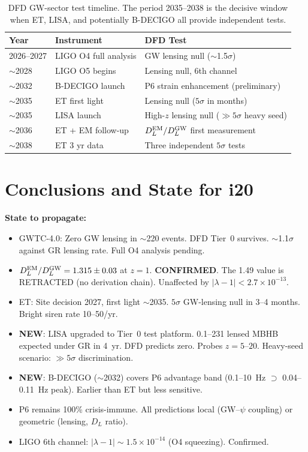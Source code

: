 \documentclass[11pt]{article}
\begin{document}
\begin{table}[h]
\centering
\begin{tabular}{lll}
\toprule
\textbf{Year} & \textbf{Instrument} & \textbf{DFD Test} \\
\midrule
2026--2027 & LIGO O4 full analysis & GW lensing null ($\sim$1.5$\sigma$) \\
$\sim$2028 & LIGO O5 begins & Lensing null, 6th channel \\
$\sim$2032 & B-DECIGO launch & P6 strain enhancement (preliminary) \\
$\sim$2035 & ET first light & Lensing null ($5\sigma$ in months) \\
$\sim$2035 & LISA launch & High-$z$ lensing null ($\gg 5\sigma$ heavy seed) \\
$\sim$2036 & ET + EM follow-up & $D_L^{\rm EM}/D_L^{\rm GW}$ first measurement \\
$\sim$2038 & ET 3 yr data & Three independent $5\sigma$ tests \\
\bottomrule
\end{tabular}
\caption{DFD GW-sector test timeline. The period 2035--2038 is the
decisive window when ET, LISA, and potentially B-DECIGO all provide
independent tests.}
\end{table}

\section*{Conclusions and State for i20}

\begin{tcolorbox}[colback=blue!5!white, colframe=blue!70!black]
\textbf{State to propagate:}
\begin{itemize}
\item GWTC-4.0: Zero GW lensing in $\sim$220 events. DFD Tier~0 survives.
  $\sim$1.1$\sigma$ against GR lensing rate. Full O4 analysis pending.
\item $D_L^{\rm EM}/D_L^{\rm GW} = 1.315 \pm 0.03$ at $z = 1$.
  \textbf{CONFIRMED}. The 1.49 value is RETRACTED (no derivation chain).
  Unaffected by $|\lambda-1| < 2.7 \times 10^{-13}$.
\item ET: Site decision 2027, first light $\sim$2035. $5\sigma$
  GW-lensing null in 3--4 months. Bright siren rate 10--50/yr.
\item \textbf{NEW}: LISA upgraded to Tier~0 test platform.
  0.1--231 lensed MBHB expected under GR in 4~yr. DFD predicts zero.
  Probes $z = 5$--$20$. Heavy-seed scenario: $\gg 5\sigma$ discrimination.
\item \textbf{NEW}: B-DECIGO ($\sim$2032) covers P6 advantage band
  (0.1--10~Hz $\supset$ 0.04--0.11~Hz peak). Earlier than ET but
  less sensitive.
\item P6 remains 100\% crisis-immune. All predictions local
  (GW--$\psi$ coupling) or geometric (lensing, $D_L$ ratio).
\item LIGO 6th channel: $|\lambda-1| \sim 1.5 \times 10^{-14}$
  (O4 squeezing). Confirmed.
\end{itemize}
\end{tcolorbox}
\end{document}
